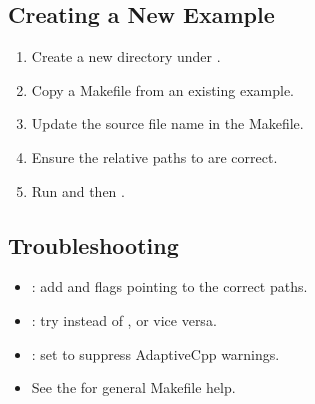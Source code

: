 \documentclass[a4paper,10pt,english]{sphinxmanual}
\begin{document}
\subsection{Creating a New Example}
\label{\detokenize{user-guide/makefiles:creating-a-new-example}}\begin{enumerate}
%
\item {} 
\sphinxAtStartPar
Create a new directory under .

\item {} 
\sphinxAtStartPar
Copy a Makefile from an existing example.

\item {} 
\sphinxAtStartPar
Update the source file name in the Makefile.

\item {} 
\sphinxAtStartPar
Ensure the relative paths to  are correct.

\item {} 
\sphinxAtStartPar
Run  and then .

\end{enumerate}


\subsection{Troubleshooting}
\label{\detokenize{user-guide/makefiles:troubleshooting}}\begin{itemize}
\item {} 
\sphinxAtStartPar
{}: add  and  flags pointing to the correct paths.

\item {} 
\sphinxAtStartPar
{}: try  instead of , or vice versa.

\item {} 
\sphinxAtStartPar
{}: set  to suppress AdaptiveCpp warnings.

\item {} 
\sphinxAtStartPar
See the 
for general Makefile help.

\end{itemize}
\end{document}
